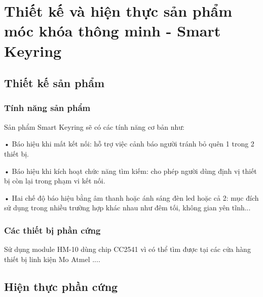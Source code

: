 
\chapter{Thiết kế và hiện thực \newline sản phẩm móc khóa thông minh - Smart Keyring}

\ifpdf
    \graphicspath{{Chapter2/Figs/Raster/}{Chapter2/Figs/PDF/}{Chapter2/Figs/}}
\else
    \graphicspath{{Chapter2/Figs/Vector/}{Chapter2/Figs/}}
\fi


\section{Thiết kế sản phẩm}
\subsection{Tính năng sản phẩm}
\label{feature}
Sản phẩm Smart Keyring sẽ có các tính năng cơ bản như:

• Báo hiệu khi mất kết nối: hỗ trợ việc cảnh báo người tránh bỏ quên 1 trong 2 thiết bị.

• Báo hiệu khi kích hoạt chức năng tìm kiếm: cho phép người dùng định vị thiết bị còn lại trong phạm vi kết nối.

• Hai chế độ báo hiệu bằng âm thanh hoặc ánh sáng đèn led hoặc cả 2: mục đích sử dụng trong nhiều trường hợp khác nhau như đêm tối, không gian yên tĩnh...

\subsection{Các thiết bị phần cứng}
Sử dụng module HM-10 dùng chip CC2541 vì có thể tìm được tại các cửa hàng thiết bị linh kiện
Mo
Atmel
....

\newpage
\section{Hiện thực phần cứng}
